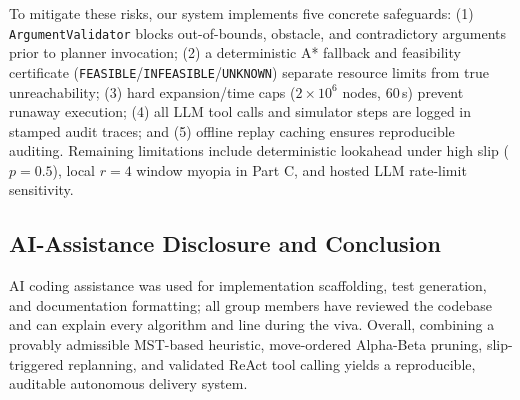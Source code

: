 \documentclass[conference]{IEEEtran}
\begin{document}
To mitigate these risks, our system implements five concrete safeguards: (1) \texttt{ArgumentValidator} blocks out-of-bounds, obstacle, and contradictory arguments prior to planner invocation; (2) a deterministic A* fallback and feasibility certificate (\texttt{FEASIBLE}/\texttt{INFEASIBLE}/\texttt{UNKNOWN}) separate resource limits from true unreachability; (3) hard expansion/time caps ($2\times 10^6$ nodes, $60$\,s) prevent runaway execution; (4) all LLM tool calls and simulator steps are logged in stamped audit traces; and (5) offline replay caching ensures reproducible auditing. Remaining limitations include deterministic lookahead under high slip ($p=0.5$), local $r=4$ window myopia in Part C, and hosted LLM rate-limit sensitivity.

\subsection{AI-Assistance Disclosure and Conclusion}
AI coding assistance was used for implementation scaffolding, test generation, and documentation formatting; all group members have reviewed the codebase and can explain every algorithm and line during the viva. Overall, combining a provably admissible MST-based heuristic, move-ordered Alpha-Beta pruning, slip-triggered replanning, and validated ReAct tool calling yields a reproducible, auditable autonomous delivery system.



\end{document}
